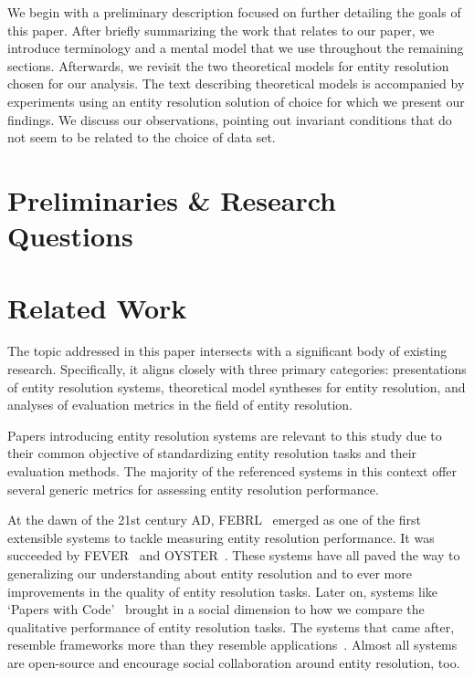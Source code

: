\documentclass[journal]{IEEEtran}
\begin{document}
    We begin with a preliminary description focused on further detailing the
    goals of this paper.
    After briefly summarizing the work that relates to our paper, we introduce
    terminology and a mental model that we use throughout the remaining
    sections.
    Afterwards, we revisit the two theoretical models for entity resolution
    chosen for our analysis.
    The text describing theoretical models is accompanied by experiments using
    an entity resolution solution of choice for which we present our findings.
    We discuss our observations, pointing out invariant conditions that do not
    seem to be related to the choice of data set.

    \section{Preliminaries \& Research Questions}\label{sec:Preliminaries & Questions}
    

    \section{Related Work}\label{sec:Related Work}
    
    The topic addressed in this paper intersects with a significant body of
    existing research.
    Specifically, it aligns closely with three primary categories: presentations
    of entity resolution systems, theoretical model syntheses for entity
    resolution, and analyses of evaluation metrics in the field of entity
    resolution.

    Papers introducing entity resolution systems are relevant to this study due
    to their common objective of standardizing entity resolution tasks and their
    evaluation methods.
    The majority of the referenced systems in this context offer several generic
    metrics for assessing entity resolution performance.

    At the dawn of the 21st century AD, FEBRL~\cite{febrl2002} emerged as one of
    the first extensible systems to tackle measuring entity resolution
    performance.
    It was succeeded by FEVER~\cite{fever2009} and OYSTER~\cite{oyster2012}.
    These systems have all paved the way to generalizing our understanding about
    entity resolution and to ever more improvements in the quality of entity
    resolution tasks.
    Later on, systems like `Papers with Code'~\cite{papwithcode2019} brought in
    a social dimension to how we compare the qualitative performance of entity
    resolution tasks.
    The systems that came after, resemble frameworks more than they resemble
    applications~\cite{magellan2020,jedai2017}.
    Almost all systems are open-source and encourage social collaboration around
    entity resolution, too.
    
\end{document}
